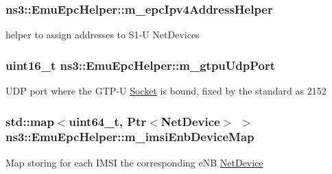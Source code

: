 \subsubsection[{\texorpdfstring{m\+\_\+epc\+Ipv4\+Address\+Helper}{m_epcIpv4AddressHelper}}]{ ns3\+::\+Emu\+Epc\+Helper\+::m\+\_\+epc\+Ipv4\+Address\+Helper\hspace{0.3cm}{\ttfamily [private]}}\hypertarget{classns3_1_1EmuEpcHelper_a53dccacd37ee9a31fbd739762a615c1b}{}\label{classns3_1_1EmuEpcHelper_a53dccacd37ee9a31fbd739762a615c1b}
helper to assign addresses to S1-\/U Net\+Devices 
\subsubsection[{\texorpdfstring{m\+\_\+gtpu\+Udp\+Port}{m_gtpuUdpPort}}]{\setlength{\rightskip}{0pt plus 5cm}uint16\+\_\+t ns3\+::\+Emu\+Epc\+Helper\+::m\+\_\+gtpu\+Udp\+Port\hspace{0.3cm}{\ttfamily [private]}}\hypertarget{classns3_1_1EmuEpcHelper_a99fe0fcbc0bd3668f30cf6ae53377a22}{}\label{classns3_1_1EmuEpcHelper_a99fe0fcbc0bd3668f30cf6ae53377a22}
U\+DP port where the G\+T\+P-\/U \hyperlink{classns3_1_1Socket}{Socket} is bound, fixed by the standard as 2152 
\subsubsection[{\texorpdfstring{m\+\_\+imsi\+Enb\+Device\+Map}{m_imsiEnbDeviceMap}}]{\setlength{\rightskip}{0pt plus 5cm}std\+::map$<$uint64\+\_\+t, {\bf Ptr}$<${\bf Net\+Device}$>$ $>$ ns3\+::\+Emu\+Epc\+Helper\+::m\+\_\+imsi\+Enb\+Device\+Map\hspace{0.3cm}{\ttfamily [private]}}\hypertarget{classns3_1_1EmuEpcHelper_ac7fabf537680e203fa2456bc1854e764}{}\label{classns3_1_1EmuEpcHelper_ac7fabf537680e203fa2456bc1854e764}
Map storing for each I\+M\+SI the corresponding e\+NB \hyperlink{classns3_1_1NetDevice}{Net\+Device} 
